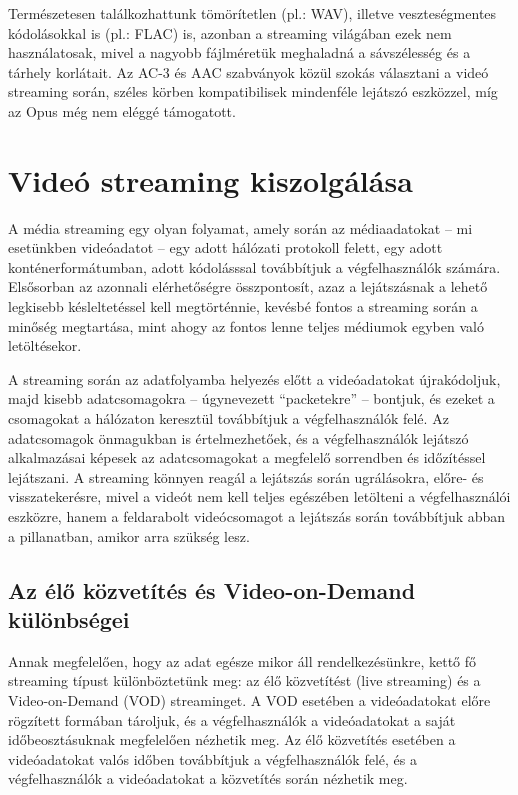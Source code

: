 Természetesen találkozhattunk tömörítetlen (pl.: WAV), illetve veszteségmentes kódolásokkal is (pl.: FLAC) is, azonban a streaming világában ezek nem használatosak, mivel a nagyobb fájlméretük meghaladná a sávszélesség és a tárhely korlátait. Az AC-3 és AAC szabványok közül szokás választani a videó streaming során, széles körben kompatibilisek mindenféle lejátszó eszközzel, míg az Opus még nem eléggé támogatott.

\section{Videó streaming kiszolgálása}\label{streamref}

A média streaming egy olyan folyamat, amely során az médiaadatokat -- mi esetünkben videóadatot -- egy adott hálózati protokoll felett, egy adott konténerformátumban, adott kódolásssal továbbítjuk a végfelhasználók számára. Elsősorban az azonnali elérhetőségre összpontosít, azaz a lejátszásnak a lehető legkisebb késleltetéssel kell megtörténnie, kevésbé fontos a streaming során a minőség megtartása, mint ahogy az fontos lenne teljes médiumok egyben való letöltésekor.

A streaming során az adatfolyamba helyezés előtt a videóadatokat újrakódoljuk, majd kisebb adatcsomagokra -- úgynevezett ``packetekre'' -- bontjuk, és ezeket a csomagokat a hálózaton keresztül továbbítjuk a végfelhasználók felé. Az adatcsomagok önmagukban is értelmezhetőek, és a végfelhasználók lejátszó alkalmazásai képesek az adatcsomagokat a megfelelő sorrendben és időzítéssel lejátszani. A streaming könnyen reagál a lejátszás során ugrálásokra, előre- és visszatekerésre, mivel a videót nem kell teljes egészében letölteni a végfelhasználói eszközre, hanem a feldarabolt videócsomagot a lejátszás során továbbítjuk abban a pillanatban, amikor arra szükség lesz.

\subsection{Az élő közvetítés és Video-on-Demand különbségei}

Annak megfelelően, hogy az adat egésze mikor áll rendelkezésünkre, kettő fő streaming típust különböztetünk meg: az élő közvetítést (live streaming) és a Video-on-Demand (VOD) streaminget. A VOD esetében a videóadatokat előre rögzített formában tároljuk, és a végfelhasználók a videóadatokat a saját időbeosztásuknak megfelelően nézhetik meg. Az élő közvetítés esetében a videóadatokat valós időben továbbítjuk a végfelhasználók felé, és a végfelhasználók a videóadatokat a közvetítés során nézhetik meg.

